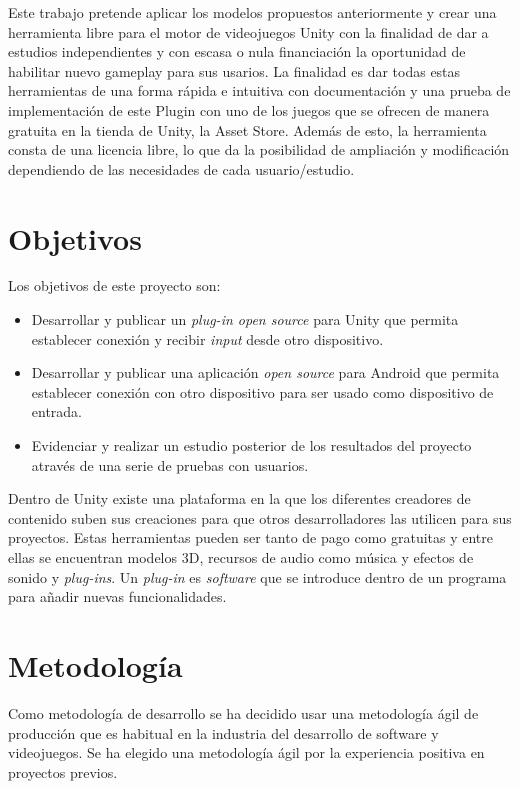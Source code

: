 Este trabajo pretende aplicar los modelos propuestos anteriormente y crear una herramienta libre para el motor de videojuegos Unity con la finalidad de dar a estudios independientes y con escasa o nula financiaci\'on la oportunidad de habilitar nuevo gameplay para sus usarios. La finalidad es dar todas estas herramientas de una forma r\'apida e intuitiva con documentaci\'on y una prueba de implementaci\'on de este Plugin con uno de los juegos que se ofrecen de manera gratuita en la tienda de Unity, la Asset Store. Adem\'as de esto, la herramienta consta de una licencia libre, lo que da la posibilidad de ampliaci\'on y modificaci\'on dependiendo de las necesidades de cada usuario/estudio.

\section{Objetivos}

Los objetivos de este proyecto son:

\begin {itemize}
\item Desarrollar y publicar un \textit{plug-in open source} para Unity que permita establecer conexi\'on y recibir \textit{input} desde otro dispositivo.
\item Desarrollar y publicar una aplicaci\'on \textit{open source} para Android que permita establecer conexi\'on con otro dispositivo para ser usado como dispositivo de entrada.
\item Evidenciar y realizar un estudio posterior de los resultados del proyecto atrav\'es de una serie de pruebas con usuarios. 
\end {itemize}

Dentro de Unity existe una plataforma  en la que los diferentes creadores de contenido suben sus creaciones para que otros desarrolladores las utilicen para sus proyectos. Estas herramientas pueden ser tanto de pago como gratuitas y entre ellas se encuentran modelos 3D, recursos de audio como m\'usica y efectos de sonido y \textit{plug-ins}. Un \textit{plug-in} es \textit{software} que se introduce dentro de un programa para a\~nadir nuevas funcionalidades. 

\section{Metodolog\'ia}

Como metodolog\'ia de desarrollo se ha decidido usar una metodolog\'ia \'agil de producci\'on que es habitual en la industria del desarrollo de software y videojuegos. Se ha elegido una metodolog\'ia \'agil por la experiencia positiva en proyectos previos.

